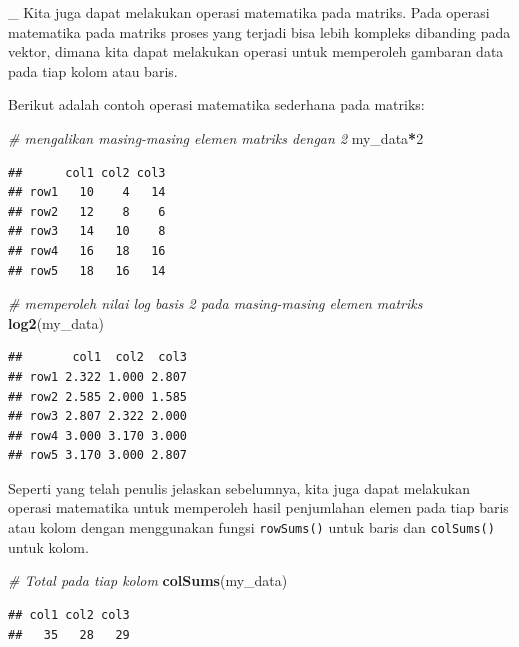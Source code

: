 \documentclass[]{book}
\newenvironment{Shaded}{\begin{snugshade}}{\end{snugshade}}
\newcommand{\KeywordTok}[1]{\textcolor[rgb]{0.13,0.29,0.53}{\textbf{#1}}}
\newcommand{\DecValTok}[1]{\textcolor[rgb]{0.00,0.00,0.81}{#1}}
\newcommand{\CommentTok}[1]{\textcolor[rgb]{0.56,0.35,0.01}{\textit{#1}}}
\newcommand{\OperatorTok}[1]{\textcolor[rgb]{0.81,0.36,0.00}{\textbf{#1}}}
\newcommand{\NormalTok}[1]{#1}
\begin{document}
\_ Kita juga dapat melakukan operasi matematika pada matriks. Pada
operasi matematika pada matriks proses yang terjadi bisa lebih kompleks
dibanding pada vektor, dimana kita dapat melakukan operasi untuk
memperoleh gambaran data pada tiap kolom atau baris.

Berikut adalah contoh operasi matematika sederhana pada matriks:

\begin{Shaded}
\begin{Highlighting}[]
\CommentTok{# mengalikan masing-masing elemen matriks dengan 2}
\NormalTok{my_data}\OperatorTok{*}\DecValTok{2}
\end{Highlighting}
\end{Shaded}

\begin{verbatim}
##      col1 col2 col3
## row1   10    4   14
## row2   12    8    6
## row3   14   10    8
## row4   16   18   16
## row5   18   16   14
\end{verbatim}

\begin{Shaded}
\begin{Highlighting}[]
\CommentTok{# memperoleh nilai log basis 2 pada masing-masing elemen matriks}
\KeywordTok{log2}\NormalTok{(my_data)}
\end{Highlighting}
\end{Shaded}

\begin{verbatim}
##       col1  col2  col3
## row1 2.322 1.000 2.807
## row2 2.585 2.000 1.585
## row3 2.807 2.322 2.000
## row4 3.000 3.170 3.000
## row5 3.170 3.000 2.807
\end{verbatim}

Seperti yang telah penulis jelaskan sebelumnya, kita juga dapat
melakukan operasi matematika untuk memperoleh hasil penjumlahan elemen
pada tiap baris atau kolom dengan menggunakan fungsi \texttt{rowSums()}
untuk baris dan \texttt{colSums()} untuk kolom.

\begin{Shaded}
\begin{Highlighting}[]
\CommentTok{# Total pada tiap kolom}
\KeywordTok{colSums}\NormalTok{(my_data)}
\end{Highlighting}
\end{Shaded}

\begin{verbatim}
## col1 col2 col3 
##   35   28   29
\end{verbatim}
\end{document}
